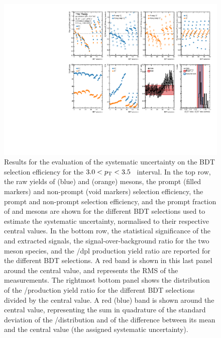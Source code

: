 \begin{figure}[h!]
    \begin{center}
    \includegraphics[width=\textwidth]{Figures/Chapter 6/BDTsyst.pdf}
    \caption{Results for the evaluation of the systematic uncertainty on the BDT selection efficiency for the \mbox{$3.0<p_\mathrm{T}<3.5$~\gevc} \pt interval. In the top row, the raw yields of \ds (blue) and \dpl (orange) mesons, the prompt (filled markers) and non-prompt (void markers) \ds selection efficiency, the prompt and non-prompt \dpl selection efficiency, and the prompt fraction of \ds and \dpl mesons are shown for the different BDT selections used to estimate the systematic uncertainty, normalised to their respective central values. In the bottom row, the statistical significance of the \ds and \dpl extracted signals, the signal-over-background ratio for the two meson species, and the \ds/dpl production yield ratio are reported for the different BDT selections. A red band is shown in this last panel around the central value, and represents the RMS of the measurements. The rightmost bottom panel shows the distribution of the \ds/\dpl production yield ratio for the different BDT selections divided by the central value. A red (blue) band is shown around the central value, representing the sum in quadrature of the standard deviation of the \ds/\dpl distribution and of the difference between its mean and the central value (the assigned systematic uncertainty).} 
    \label{fig:BDT_efficiency} 
    \end{center}
\end{figure}

